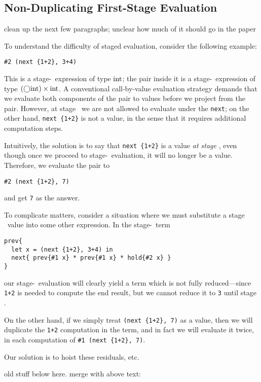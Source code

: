 \subsection{Non-Duplicating First-Stage Evaluation}

\TODO clean up the next few paragraphs; unclear how much of it should go in the
paper

To understand the difficulty of staged evaluation, consider the following
example:
\begin{lstlisting}
#2 (next {1+2}, 3+4)
\end{lstlisting}
This is a stage-\bbone\ expression of type ${\rm int}$; the pair inside it is a
stage-\bbone\ expression of type $(\bigcirc{\rm int})\times{\rm int}$. A conventional
call-by-value evaluation strategy demands that we evaluate both components of
the pair to values before we project from the pair. However, at stage \bbone\ we
are not allowed to evaluate under the \verb|next|; on the other hand, 
\verb|next {1+2}| is not a value, in the sense that it requires additional
computation steps.

Intuitively, the solution is to say that \verb|next {1+2}| is a value \emph{at
stage \bbone}, even though once we proceed to stage-\bbtwo\ evaluation, it will
no longer be a value. Therefore, we evaluate the pair to
\begin{lstlisting}
#2 (next {1+2}, 7)
\end{lstlisting}
and get \verb|7| as the answer.

To complicate matters, consider a situation where we must substitute a stage
\bbone\ value into some other expression. In the stage-\bbtwo\ term
\begin{lstlisting} 
prev{
  let x = (next {1+2}, 3+4) in
  next{ prev{#1 x} * prev{#1 x} * hold{#2 x} }
}
\end{lstlisting}
our stage-\bbone\ evaluation will clearly yield a term which is not fully
reduced---since \verb|1+2| is needed to compute the end result, but we cannot
reduce it to \verb|3| until stage \bbtwo.

On the other hand, if we simply treat \verb|(next {1+2}, 7)| as a value, then we
will duplicate the \verb|1+2| computation in the term, and in fact we will
evaluate it twice, in each computation of \verb|#1 (next {1+2}, 7)|.

Our solution is to hoist these residuals, etc.

\vspace{2em}
\TODO old stuff below here. merge with above text:

